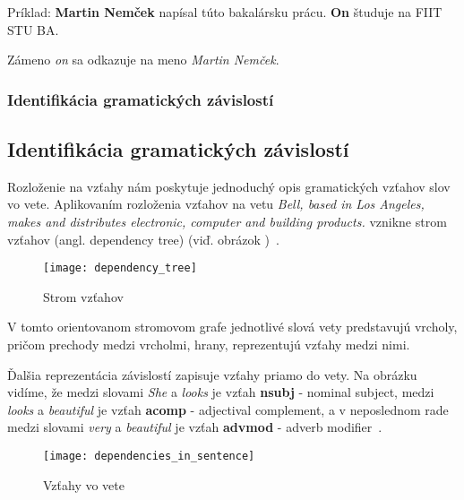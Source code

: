 Príklad:
\textbf{Martin Nemček} napísal túto bakalársku prácu. \textbf{On} študuje na FIIT STU BA.

Zámeno \textit{on} sa odkazuje na meno \textit{Martin Nemček}.

%
%
{
	\subsubsection{Identifikácia gramatických závislostí}
}
{
	\subsection{Identifikácia gramatických závislostí}
}
\label{subsubsec:dependencyparsing}
Rozloženie na vzťahy nám poskytuje jednoduchý opis gramatických vzťahov slov vo vete. Aplikovaním rozloženia vzťahov na vetu \textit{Bell, based in Los
Angeles, makes and distributes electronic, computer and building products.
} vznikne strom vzťahov (angl. dependency tree) (viď. obrázok )~\cite{StanfordDepManual}.

\begin{figure}[H]
\begin{center}\texttt{[image: dependency\_tree]}\end{center}
\caption[Strom vzťahov]{Strom vzťahov}\label{fig:dependency_tree}
\end{figure}

V tomto orientovanom stromovom grafe jednotlivé slová vety predstavujú vrcholy, pričom prechody medzi vrcholmi, hrany, reprezentujú vzťahy medzi nimi.

Ďalšia reprezentácia závislostí zapisuje vzťahy priamo do vety. Na obrázku  vidíme, že medzi slovami \textit{She} a \textit{looks} je vzťah \textbf{nsubj} - nominal subject, medzi \textit{looks} a \textit{beautiful} je vzťah \textbf{acomp} - adjectival complement, a v neposlednom rade medzi slovami \textit{very} a \textit{beautiful} je vzťah \textbf{advmod} - adverb modifier~\cite{StanfordDepManual}.

\begin{figure}[H]
\begin{center}\texttt{[image: dependencies\_in\_sentence]}\end{center}
\caption[Vzťahy vo vete]{Vzťahy vo vete}\label{fig:dependencies_in_sentence}
\end{figure}

